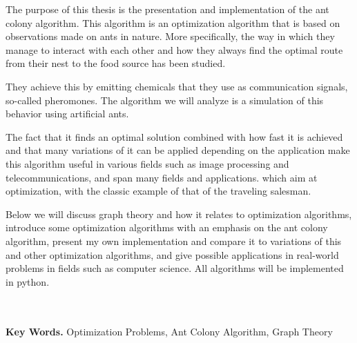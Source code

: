 {\latintext
\begin{center}
{}
\end{center}
{\small
	{\lt The purpose of this thesis is the presentation and implementation of the ant colony algorithm. This algorithm is an optimization algorithm that is based on observations made on ants in nature. More specifically, the way in which they manage to interact with each other and how they always find the optimal route from their nest to the food source has been studied.

  They achieve this by emitting chemicals that they use as communication signals, so-called pheromones. The algorithm we will analyze is a simulation of this behavior using artificial ants.
 
 The fact that it finds an optimal solution combined with how fast it is achieved and that many variations of it can be applied depending on the application make this algorithm useful in various fields such as image processing and telecommunications, and span many fields and applications. which aim at optimization, with the classic example of that of the traveling salesman.

Below we will discuss graph theory and how it relates to optimization algorithms, introduce some optimization algorithms with an emphasis on the ant colony algorithm, present my own implementation and compare it to variations of this and other optimization algorithms, and give possible applications in real-world problems in fields such as computer science. All algorithms will be implemented in python.}
	\ \\\\
{\bf Key Words.} Οptimization Problems, Ant Colony Algorithm, Graph Theory
}}